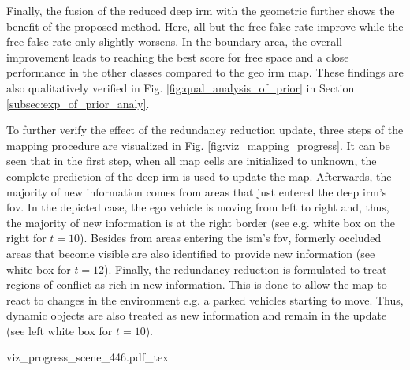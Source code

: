 Finally, the fusion of the reduced deep \gls{irm} with the geometric further shows the benefit of the proposed method. Here, all but the free false rate improve while the free false rate only slightly worsens. In the boundary area, the overall improvement leads to reaching the best score for free space and a close performance in the other classes compared to the geo \gls{irm} map. These findings are also qualitatively verified in Fig. \ref{fig:qual_analysis_of_prior} in Section \ref{subsec:exp_of_prior_analy}.
\begin{center}
\end{center}
To further verify the effect of the redundancy reduction update, three steps of the mapping procedure are visualized in Fig. \ref{fig:viz_mapping_progress}. It can be seen that in the first step, when all map cells are initialized to unknown, the complete prediction of the deep \gls{irm} is used to update the map. Afterwards, the majority of new information comes from areas that just entered the deep \gls{irm}'s \gls{fov}.
In the depicted case, the ego vehicle is moving from left to right and, thus, the majority of new information is at the right border (see e.g. white box on the right for $t=10$). 
Besides from areas entering the \gls{ism}'s \gls{fov}, formerly occluded areas that become visible are also identified to provide new information (see white box for $t=12$). Finally, the redundancy reduction is formulated to treat regions of conflict as rich in new information. This is done to allow the map to react to changes in the environment e.g. a parked vehicles starting to move. Thus, dynamic objects are also treated as new information and remain in the update (see left white box for $t=10$).
\begin{center}
	{viz_progress_scene_446.pdf_tex}
\end{center}
%

